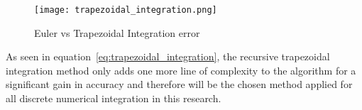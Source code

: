 \begin{figure}[h!]
 \centering
  \texttt{[image: trapezoidal\_integration.png]}
  \caption{Euler vs Trapezoidal Integration error}
  \label{fig:trapezoidal_integration}
\end{figure}

As seen in equation~\ref{eq:trapezoidal_integration}, the recursive trapezoidal integration method only adds one more line of complexity to the algorithm for a significant gain in accuracy and therefore will be the chosen method applied for all discrete numerical integration in this research.













